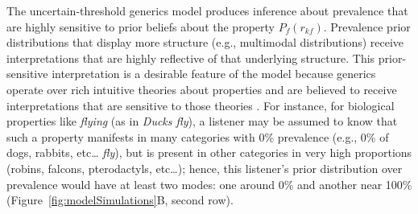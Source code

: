 \documentclass[floatsintext,doc]{apa6}
\let\rmarkdownfootnote\footnote%
\def\footnote{\protect\rmarkdownfootnote}
\begin{document}



 
 The uncertain-threshold generics model produces inference about prevalence that are highly sensitive to prior beliefs about the property $P_f(r_{kf})$. 
 Prevalence prior distributions that display more structure (e.g., multimodal distributions) receive interpretations that are highly reflective of that underlying structure.
 This prior-sensitive interpretation is a desirable feature of the model because generics operate over rich intuitive theories about properties and are believed to receive interpretations that are sensitive to those theories \cite{Leslie2007, Gelman2010:essentialist, Cimpian2010theory, Rhodes2012, Prasada2013}. 
 For instance, for biological properties like \emph{flying} (as in \emph{Ducks fly}), a listener may be assumed to know that such a property manifests in many categories with 0\% prevalence (e.g., 0\% of dogs, rabbits, etc\ldots{} \emph{fly}), but is present in other categories in very high proportions (robins, falcons, pterodactyls, etc\ldots{}); hence, this listener's prior distribution over prevalence would have at least two modes: one around 0\% and another near 100\% (Figure~\ref{fig:modelSimulations}B, second row).
\end{document}
